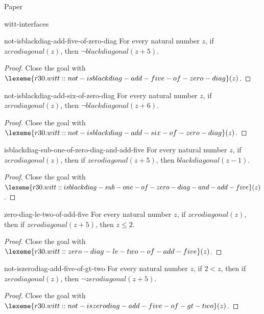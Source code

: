 \begin{lexlean}{Paper}
\begin{section}{witt-interfaces}
  \begin{theorem}{not-isblackdiag-add-five-of-zero-diag}
  For every natural number \(z\), if \(zerodiagonal(z)\), then \(¬ blackdiagonal(z + 5)\).
  \begin{proof}
  Close the goal with \(\lexeme{r30.witt::not-isblackdiag-add-five-of-zero-diag}(z)\).
  \end{proof}
  \end{theorem}

  \begin{theorem}{not-isblackdiag-add-six-of-zero-diag}
  For every natural number \(z\), if \(zerodiagonal(z)\), then \(¬ blackdiagonal(z + 6)\).
  \begin{proof}
  Close the goal with \(\lexeme{r30.witt::not-isblackdiag-add-six-of-zero-diag}(z)\).
  \end{proof}
  \end{theorem}

  \begin{theorem}{isblackdiag-sub-one-of-zero-diag-and-add-five}
  For every natural number \(z\), if \(zerodiagonal(z)\), then if \(zerodiagonal(z + 5)\), then \(blackdiagonal(z - 1)\).
  \begin{proof}
  Close the goal with \(\lexeme{r30.witt::isblackdiag-sub-one-of-zero-diag-and-add-five}(z)\).
  \end{proof}
  \end{theorem}

  \begin{theorem}{zero-diag-le-two-of-add-five}
  For every natural number \(z\), if \(zerodiagonal(z)\), then if \(zerodiagonal(z + 5)\), then \(z ≤ 2\).
  \begin{proof}
  Close the goal with \(\lexeme{r30.witt::zero-diag-le-two-of-add-five}(z)\).
  \end{proof}
  \end{theorem}

  \begin{theorem}{not-iszerodiag-add-five-of-gt-two}
  For every natural number \(z\), if \(2 < z\), then if \(zerodiagonal(z)\), then \(¬ zerodiagonal(z + 5)\).
  \begin{proof}
  Close the goal with \(\lexeme{r30.witt::not-iszerodiag-add-five-of-gt-two}(z)\).
  \end{proof}
  \end{theorem}


\end{section}
\end{lexlean}
